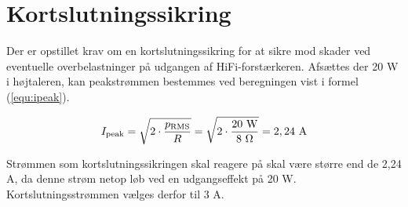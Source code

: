 \section{Kortslutningssikring}
\label{valg_kortslutningssikring}
Der er opstillet krav om en kortslutningssikring for at sikre mod skader ved eventuelle overbelastninger på udgangen af HiFi-forstærkeren. Afsættes der 20 W i højtaleren, kan peakstrømmen bestemmes ved beregningen vist i formel (\ref{equ:ipeak}).

\begin{equation}
\label{equ:ipeak}
I_{\mathrm{peak}} = \sqrt{2 \cdot \frac{p_{\mathrm{RMS}}}{R}} = \sqrt{2 \cdot \frac{\mathrm{20~W}}{8~\ohm}}  = \mathrm{2,24~A}
\end{equation}

Strømmen som kortslutningssikringen skal reagere på skal være større end de 2,24 A, da denne strøm netop løb ved en udgangseffekt på 20 W. Kortslutningsstrømmen vælges derfor til 3 A. 